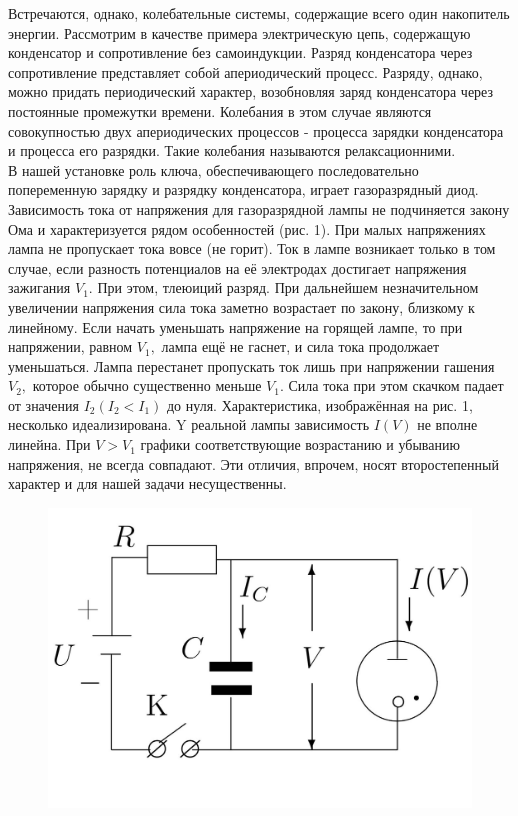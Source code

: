 \documentclass[a4paper,12pt]{article} %
\begin{document}
Встречаются, однако, колебательные системы, содержащие всего один накопитель энергии. Рассмотрим в качестве примера электрическую цепь, содержащую конденсатор и сопротивление без самоиндукции. Разряд конденсатора через сопротивление представляет собой апериодический процесс. Разряду, однако, можно придать периодический характер, возобновляя заряд конденсатора через постоянные промежутки времени. Колебания в этом случае являются совокупностью двух апериодических процессов - процесса зарядки конденсатора и процесса его разрядки. Такие колебания называются релаксационними.\\
В нашей установке роль ключа, обеспечивающего последовательно попеременную зарядку и разрядку конденсатора, играет газоразрядный диод. Зависимость тока от напряжения для газоразрядной лампы не подчиняется закону Ома и характеризуется рядом особенностей (рис. 1). При малых напряжениях лампа не пропускает тока вовсе (не горит). Ток в лампе возникает только в том случае, если разность потенциалов на её электродах достигает напряжения зажигания $V_{1} .$ При этом, тлеюиций разряд. При дальнейшем незначительном увеличении напряжения сила тока заметно возрастает по закону, близкому к линейному. 
Если начать уменьшать напряжение на горящей лампе, то при напряжении, равном $V_{1},$ лампа ещё не гаснет, и сила тока продолжает уменьшаться. Лампа перестанет пропускать ток лишь при напряжении гашения $V_{2},$ которое обычно существенно меньше $V_{1}$. Сила тока при этом скачком падает от значения $I_{2}\left(I_{2}<I_{1}\right)$ до нуля. Характеристика, изображённая на рис. 1, несколько идеализирована. $\mathrm{Y}$ реальной лампы зависимость $I(V)$ не вполне линейна. При $V>V_{1}$ графики
соответствующие возрастанию и убыванию напряжения, не всегда совпадают. Эти отличия, впрочем, носят второстепенный характер и для нашей задачи несущественны.


\begin{figure} 
\begin{center}
\includegraphics[width=1\textwidth]{scheme.jpg}
\caption{}
\label{osc}
\end{center}
\end{figure}
\end{document}
